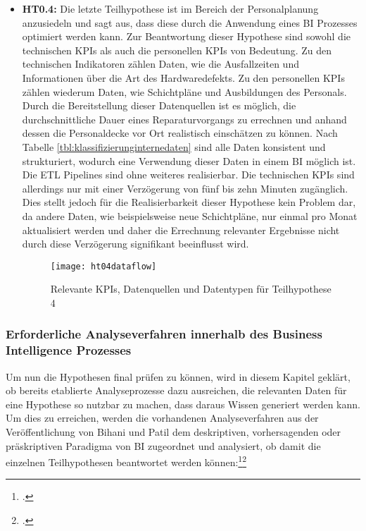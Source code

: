 \begin{itemize}
    \item \textbf{\ac{HT0.4}: }Die letzte Teilhypothese ist im Bereich der Personalplanung anzusiedeln und sagt aus, dass
    diese durch die Anwendung eines \ac{BI} Prozesses optimiert werden kann. Zur Beantwortung dieser Hypothese sind sowohl
    die technischen \acp{KPI} als auch die personellen \acp{KPI} von Bedeutung. Zu den technischen Indikatoren zählen Daten,
    wie die Ausfallzeiten und Informationen über die Art des Hardwaredefekts. Zu den personellen \acp{KPI} zählen wiederum Daten,
    wie Schichtpläne und Ausbildungen des Personals. Durch die Bereitstellung dieser Datenquellen ist es möglich, die
    durchschnittliche Dauer eines Reparaturvorgangs zu errechnen und anhand dessen die Personaldecke vor Ort realistisch
    einschätzen zu können. Nach Tabelle \ref{tbl:klassifizierunginternedaten} sind alle Daten konsistent und strukturiert,
    wodurch eine Verwendung dieser Daten in einem \ac{BI} möglich ist. Die \ac{ETL} Pipelines sind ohne weiteres realisierbar.
    Die technischen \acp{KPI} sind allerdings nur mit einer Verzögerung von fünf bis zehn Minuten zugänglich. Dies stellt jedoch
    für die Realisierbarkeit dieser Hypothese kein Problem dar, da andere Daten, wie beispielsweise neue Schichtpläne, nur einmal
    pro Monat aktualisiert werden und daher die Errechnung relevanter Ergebnisse nicht durch diese Verzögerung signifikant
    beeinflusst wird.

    \begin{figure}[H]
        \caption{Relevante KPIs, Datenquellen und Datentypen für Teilhypothese 4}
        \texttt{[image: ht04dataflow]}
        \label{figure:ht04dataflow}
    \end{figure}
\end{itemize}

\subsubsection{Erforderliche Analyseverfahren innerhalb des Business Intelligence Prozesses} \label{toc:analyseverfahrenbi}

Um nun die Hypothesen final prüfen zu können, wird in diesem Kapitel geklärt, ob bereits etablierte Analyseprozesse dazu
ausreichen, die relevanten Daten für eine Hypothese so nutzbar zu machen, dass daraus Wissen generiert werden kann. Um dies
zu erreichen, werden die vorhandenen Analyseverfahren aus der Veröffentlichung von Bihani und Patil dem deskriptiven,
vorhersagenden oder präskriptiven Paradigma von \ac{BI} zugeordnet und analysiert, ob damit die einzelnen Teilhypothesen
beantwortet werden können:\footcite[Vgl.][S. 97ff]{bihani2014comparative}\footcite[Vgl.][Abb. 2]{bihani2014comparative}

